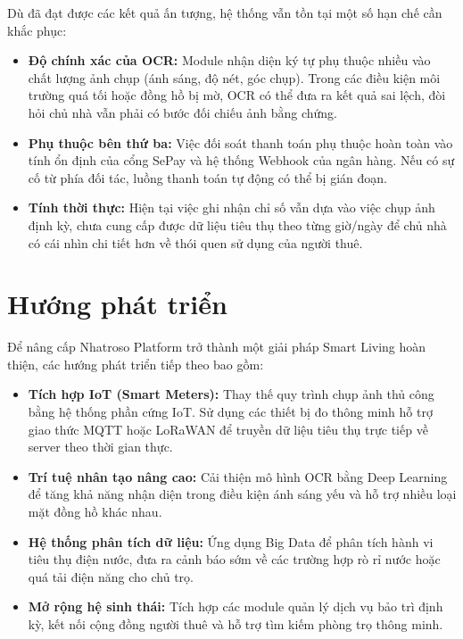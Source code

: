Dù đã đạt được các kết quả ấn tượng, hệ thống vẫn tồn tại một số hạn chế cần khắc phục:
\begin{itemize}
    \item \textbf{Độ chính xác của OCR:} Module nhận diện ký tự phụ thuộc nhiều vào chất lượng ảnh chụp (ánh sáng, độ nét, góc chụp). Trong các điều kiện môi trường quá tối hoặc đồng hồ bị mờ, OCR có thể đưa ra kết quả sai lệch, đòi hỏi chủ nhà vẫn phải có bước đối chiếu ảnh bằng chứng.
    \item \textbf{Phụ thuộc bên thứ ba:} Việc đối soát thanh toán phụ thuộc hoàn toàn vào tính ổn định của cổng SePay và hệ thống Webhook của ngân hàng. Nếu có sự cố từ phía đối tác, luồng thanh toán tự động có thể bị gián đoạn.
    \item \textbf{Tính thời thực:} Hiện tại việc ghi nhận chỉ số vẫn dựa vào việc chụp ảnh định kỳ, chưa cung cấp được dữ liệu tiêu thụ theo từng giờ/ngày để chủ nhà có cái nhìn chi tiết hơn về thói quen sử dụng của người thuê.
\end{itemize}

\section{Hướng phát triển}

Để nâng cấp Nhatroso Platform trở thành một giải pháp Smart Living hoàn thiện, các hướng phát triển tiếp theo bao gồm:
\begin{itemize}
    \item \textbf{Tích hợp IoT (Smart Meters):} Thay thế quy trình chụp ảnh thủ công bằng hệ thống phần cứng IoT. Sử dụng các thiết bị đo thông minh hỗ trợ giao thức MQTT hoặc LoRaWAN để truyền dữ liệu tiêu thụ trực tiếp về server theo thời gian thực.
    \item \textbf{Trí tuệ nhân tạo nâng cao:} Cải thiện mô hình OCR bằng Deep Learning để tăng khả năng nhận diện trong điều kiện ánh sáng yếu và hỗ trợ nhiều loại mặt đồng hồ khác nhau.
    \item \textbf{Hệ thống phân tích dữ liệu:} Ứng dụng Big Data để phân tích hành vi tiêu thụ điện nước, đưa ra cảnh báo sớm về các trường hợp rò rỉ nước hoặc quá tải điện năng cho chủ trọ.
    \item \textbf{Mở rộng hệ sinh thái:} Tích hợp các module quản lý dịch vụ bảo trì định kỳ, kết nối cộng đồng người thuê và hỗ trợ tìm kiếm phòng trọ thông minh.
\end{itemize}

